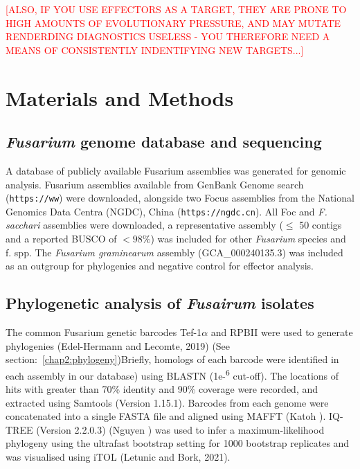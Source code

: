 \textcolor{red}{[ALSO, IF YOU USE EFFECTORS AS A TARGET, THEY ARE PRONE TO HIGH AMOUNTS OF EVOLUTIONARY PRESSURE, AND MAY MUTATE RENDERDING DIAGNOSTICS USELESS - YOU THEREFORE NEED A MEANS OF CONSISTENTLY INDENTIFYING NEW TARGETS...]}

\newpage
\section{Materials and Methods}

\subsection{\textit{Fusarium} genome database and sequencing}\label{chap3:fusariumdb}
A database of publicly available Fusarium assemblies was generated for genomic analysis. Fusarium assemblies available from GenBank Genome search (\texttt{https://ww}) were downloaded, alongside two \ac{Focus} assemblies from the National Genomics Data Centra (NGDC), China (\texttt{https://ngdc.cn}). All Foc and \textit{F. sacchari }assemblies were downloaded, a representative assembly (\( \leq \) 50 contigs and a reported BUSCO of \(<98\% \)) was included for other \textit{Fusarium} species and f. spp. The \textit{Fusarium graminearum} assembly (GCA\_000240135.3) was included as an outgroup for phylogenies and negative control for effector analysis.

\subsection{Phylogenetic analysis of \textit{Fusairum} isolates}
The common Fusarium genetic barcodes Tef-1\(\alpha\) and RPBII  were used to generate phylogenies (Edel-Hermann and Lecomte, 2019) (See section:~\ref{chap2:phylogeny})Briefly, homologs of each barcode were identified in each assembly in our database) using BLASTN (1e-\textsuperscript{6} cut-off). The locations of hits with greater than 70\% identity and 90\% coverage were recorded, and extracted using Samtools (Version 1.15.1). Barcodes from each genome were concatenated into a single FASTA file and aligned using MAFFT (Katoh ). IQ-TREE (Version 2.2.0.3) (Nguyen ) was used to infer a maximum-likelihood phylogeny using the ultrafast bootstrap setting for 1000 bootstrap replicates and was visualised using iTOL (Letunic and Bork, 2021). 

